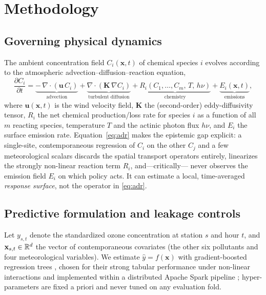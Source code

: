 \section{Methodology}
\label{sec:methods}

\subsection{Governing physical dynamics}
The ambient concentration field $C_i(\mathbf{x},t)$ of chemical species $i$ evolves
according to the atmospheric advection--diffusion--reaction equation,
\begin{equation}
  \frac{\partial C_i}{\partial t}
  = \underbrace{-\,\nabla \cdot (\mathbf{u}\, C_i)}_{\text{advection}}
  + \underbrace{\nabla \cdot (\mathbf{K}\, \nabla C_i)}_{\text{turbulent diffusion}}
  + \underbrace{R_i(C_1,\dots,C_m,\,T,\,h\nu)}_{\text{chemistry}}
  + \underbrace{E_i(\mathbf{x},t)}_{\text{emissions}},
  \label{eq:adr}
\end{equation}
where $\mathbf{u}(\mathbf{x},t)$ is the wind velocity field, $\mathbf{K}$ the
(second-order) eddy-diffusivity tensor, $R_i$ the net chemical production/loss rate for
species $i$ as a function of all $m$ reacting species, temperature $T$ and the actinic
photon flux $h\nu$, and $E_i$ the surface emission rate. Equation~\eqref{eq:adr} makes
the epistemic gap explicit: a single-site, contemporaneous regression of $C_i$ on the
other $C_j$ and a few meteorological scalars discards the spatial transport operators
entirely, linearizes the strongly non-linear reaction term $R_i$, and---critically---
never observes the emission field $E_i$ on which policy acts. It can estimate a local,
time-averaged \emph{response surface}, not the operator in \eqref{eq:adr}.

\subsection{Predictive formulation and leakage controls}
Let $y_{s,t}$ denote the standardized ozone concentration at station $s$ and hour $t$,
and $\mathbf{x}_{s,t}\in\mathbb{R}^{d}$ the vector of contemporaneous covariates (the other
six pollutants and four meteorological variables). We estimate $\hat y = f(\mathbf{x})$
with gradient-boosted regression trees \citep{chen2016xgboost}, chosen for their strong
tabular performance under non-linear interactions and implemented within a distributed
Apache Spark pipeline \citep{zaharia2016spark}; hyper-parameters are fixed a priori and
never tuned on any evaluation fold.

